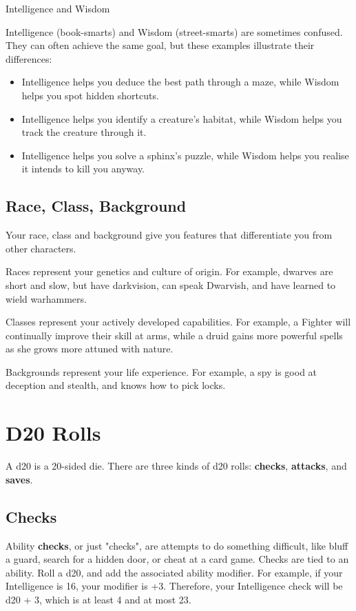 \documentclass[letterpaper,twocolumn,openany,nodeprecatedcode,bg=print]{dndbook}
\begin{document}
\begin{DndComment}{Intelligence and Wisdom}

\noindent Intelligence (book-smarts) and Wisdom (street-smarts) are sometimes confused. 
They can often achieve the same goal, but these examples illustrate their differences:
\begin{itemize}
\item Intelligence helps you deduce the best path through a maze, while Wisdom helps you spot hidden shortcuts.
\item Intelligence helps you identify a creature's habitat, while Wisdom helps you track the creature through it.
\item Intelligence helps you solve a sphinx's puzzle, while Wisdom helps you realise it intends to kill you anyway.
\end{itemize}
\end{DndComment}

\subsection{Race, Class, Background}
Your race, class and background give you features that differentiate you from other characters. 

Races represent your genetics and culture of origin. 
For example, dwarves are short and slow, but have darkvision, can speak Dwarvish, and have learned to wield warhammers. 

Classes represent your actively developed capabilities. 
For example, a Fighter will continually improve their skill at arms, 
while a druid gains more powerful spells as she grows more attuned with nature. 

Backgrounds represent your life experience. 
For example, a spy is good at deception and stealth, and knows how to pick locks. 


\newpage
\section{D20 Rolls}

A d20 is a 20-sided die. 
There are three kinds of d20 rolls: \textbf{checks}, \textbf{attacks}, and \textbf{saves}.

\subsection{Checks}
Ability \textbf{checks}, or just "checks", are attempts to do something difficult, 
like bluff a guard, search for a hidden door, or cheat at a card game. 
Checks are tied to an ability. 
Roll a d20, and add the associated ability modifier. 
For example, if your Intelligence is 16, your modifier is +3. 
Therefore, your Intelligence check will be d20 + 3, which is at least 4 and at most 23.
\end{document}
